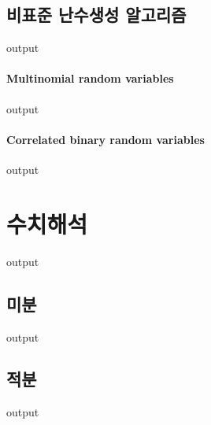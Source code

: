 \documentclass{book}
\begin{document}
\subsection{비표준 난수생성 알고리즘}
\begin{Schunk}
\begin{Soutput}
output
\end{Soutput}
\end{Schunk}
\paragraph{Multinomial random variables}
\begin{Schunk}
\begin{Soutput}
output
\end{Soutput}
\end{Schunk}

\paragraph{Correlated binary random variables}
\begin{Schunk}
\begin{Soutput}
output
\end{Soutput}
\end{Schunk}

\section{수치해석}
\begin{Schunk}
\begin{Soutput}
output
\end{Soutput}
\end{Schunk}

\subsection{미분}
\begin{Schunk}
\begin{Soutput}
output
\end{Soutput}
\end{Schunk}

\subsection{적분}
\begin{Schunk}
\begin{Soutput}
output
\end{Soutput}
\end{Schunk}
\end{document}
